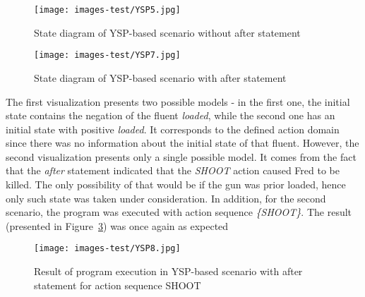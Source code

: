 \documentclass[a4paper]{article}
\begin{document}
\begin{figure}[htp]
    \centering
    \texttt{[image: images-test/YSP5.jpg]}
    \caption{State diagram of YSP-based scenario without after statement}
    \label{fig:ysp6}
\end{figure}
\begin{figure}[htp]
    \centering
    \texttt{[image: images-test/YSP7.jpg]}
    \caption{State diagram of YSP-based scenario with after statement}
    \label{fig:ysp7}
\end{figure}
The first visualization presents two possible models - in the first one, the initial state contains the negation of the fluent \textit{loaded}, while the second one has an initial state with positive \textit{loaded}. It corresponds to the defined action domain since there was no information about the initial state of that fluent. However, the second visualization presents only a single possible model. It comes from the fact that the \textit{after} statement indicated that the \textit{SHOOT} action caused Fred to be killed. The only possibility of that would be if the gun was prior loaded, hence only such state was taken under consideration.
In addition, for the second scenario, the program was executed with action sequence \textit{\{SHOOT\}}. The result (presented in Figure~\ref{fig:ysp8}) was once again as expected
\begin{figure}[htp]
    \centering
    \texttt{[image: images-test/YSP8.jpg]}
    \caption{Result of program execution in YSP-based scenario with after statement for action sequence SHOOT}
    \label{fig:ysp8}
\end{figure}

\end{document}
